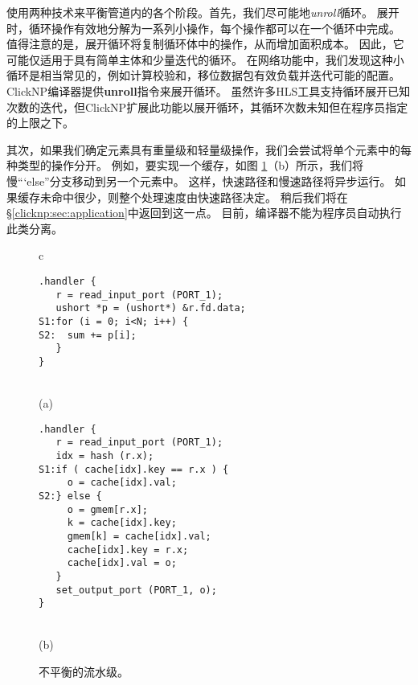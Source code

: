 \name 使用两种技术来平衡管道内的各个阶段。首先，我们尽可能地\textit {unroll}循环。
展开时，循环操作有效地分解为一系列小操作，每个操作都可以在一个循环中完成。
值得注意的是，展开循环将复制循环体中的操作，从而增加面积成本。
因此，它可能仅适用于具有简单主体和少量迭代的循环。
在网络功能中，我们发现这种小循环是相当常见的，例如计算校验和，移位数据包有效负载并迭代可能的配置。
ClickNP编译器提供\textbf {unroll}指令来展开循环。
虽然许多HLS工具支持循环展开已知次数的迭代，但ClickNP扩展此功能以展开循环，其循环次数未知但在程序员指定的上限之下。

\iffalse
\textbf{提供 pragma 让程序员指定最高循环次数}
\fi

其次，如果我们确定元素具有重量级和轻量级操作，我们会尝试将单个元素中的每种类型的操作分开。
例如，要实现一个缓存，如图 \ref {clicknp:fig:unbalance}（b）所示，我们将慢“`else”分支移动到另一个元素中。
这样，快速路径和慢速路径将异步运行。
如果缓存未命中很少，则整个处理速度由快速路径决定。
稍后我们将在\S \ref {clicknp:sec:application}中返回到这一点。
目前，\name 编译器不能为程序员自动执行此类分离。

\iffalse
\textbf{讨论 async}。

\textbf{更新 ClickNP 语法，端口名称}。
\fi


\begin{figure}
\lstset{style=numbers}

\centering

\begin{tabular}{c}
{
\small
\begin{lstlisting}[escapechar=@]
.handler {
   r = read_input_port (PORT_1);
   ushort *p = (ushort*) &r.fd.data;
S1:for (i = 0; i<N; i++) {
S2:  sum += p[i];
   }
}
\end{lstlisting} 
} \\
(a) \vspace{3pt} \\
{
\small 
\begin{lstlisting}[escapechar=@]
.handler {
   r = read_input_port (PORT_1);
   idx = hash (r.x);
S1:if ( cache[idx].key == r.x ) {
     o = cache[idx].val;
S2:} else {
     o = gmem[r.x];
     k = cache[idx].key;
     gmem[k] = cache[idx].val;
     cache[idx].key = r.x;
     cache[idx].val = o;
   }
   set_output_port (PORT_1, o);
}
\end{lstlisting} 
} \\
(b) \vspace{3pt} 
\end{tabular}

\caption{不平衡的流水级。}
\label{clicknp:fig:unbalance}

\end{figure}


